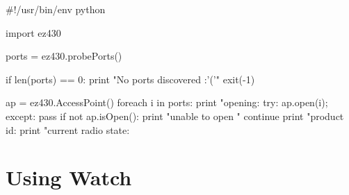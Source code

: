 \documentclass[11pt,a4paper]{article}
\begin{document}
\begin{python}
#!/usr/bin/env python

import ez430

ports = ez430.probePorts()

if len(ports) == 0:
	print "No ports discovered :'('"
	exit(-1)

ap = ez430.AccessPoint()
foreach i in ports:
	print "opening: %
	try:
		ap.open(i);
	except:
		pass
	if not ap.isOpen():
		print "unable to open "
		continue
	print "product id: %
	print "current radio state: %
\end{python}

\section{Using Watch}

\end{document}
